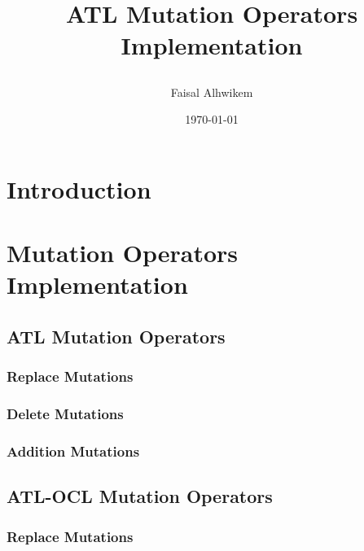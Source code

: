 \documentclass[a4paper,12pt]{article}
\title{ATL Mutation Operators Implementation\\
\vspace*{5mm}
\large{}
\vspace*{5cm}
\author{Faisal Alhwikem}
}
\date{\today}
\begin{document}
\maketitle
\thispagestyle{empty} %
\clearpage

\newpage
{} %

\tableofcontents
\newpage

\setcounter{page}{1}


\section{Introduction}

\newpage

\section{Mutation Operators Implementation}
\subsection{ATL Mutation Operators}
\subsubsection{Replace Mutations}

\subsubsection{Delete Mutations}

\subsubsection{Addition Mutations}

\newpage
\subsection{ATL-OCL Mutation Operators}
\subsubsection{Replace Mutations}
\end{document}
